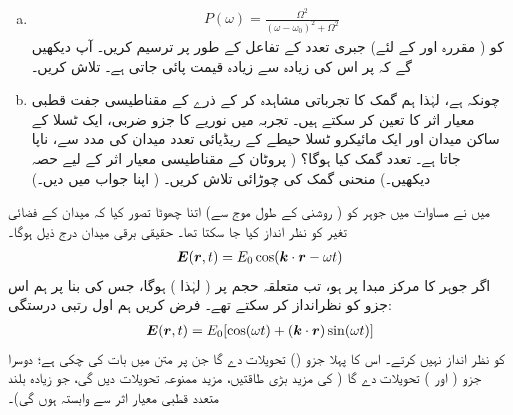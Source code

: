 \begin{enumerate}[a.]
 
\item
{}
\begin{align}
	P(\omega) = \frac{\Omega^2}{(\omega-\omega_0)^2+\Omega^2}
\end{align}
کو ( مقررہ  اور  کے لئے) جبری تعدد  کے تفاعل کے طور پر ترسیم کریں۔ آپ دیکھیں گے کہ  پر اس کی زیادہ سے زیادہ قیمت پائی جاتی ہے۔  تلاش کریں۔
\item
 چونکہ  ہے، لہٰذا ہم گمک کا تجرباتی مشاہدہ کر کے ذرے کے مقناطیسی جفت قطبی معیار اثر کا تعین کر سکتے ہیں۔  تجربہ میں نوریے کا  جزو ضربی، ایک ٹسلا کے ساکن میدان اور ایک مائیکرو ٹسلا  حیطے کے ریڈیائی تعدد میدان کی مدد سے، ناپا جاتا ہے۔ تعدد گمک کیا ہوگا؟ ( پروٹان کے مقناطیسی معیار اثر کے لیے حصہ  دیکھیں۔) منحنی گمک کی چوڑائی تلاش کریں۔ ( اپنا جواب  میں دیں۔)
 \end{enumerate}
میں نے مساوات  میں جوہر کو ( روشنی کے طول موج سے) اتنا چھوٹا تصور کیا کہ میدان کے فضائی تغیر کو نظر انداز کیا جا سکتا تھا۔ حقیقی برقی میدان درج ذیل ہوگا۔
\begin{align}
{\ensuremath{{\boldsymbol{E}}}}({{\boldsymbol{r}}},t) = E_0\cos({{\boldsymbol{k}}}\cdot {\ensuremath{{\boldsymbol{r}}}}-\omega t)
\end{align}
اگر جوہر کا مرکز مبدا پر ہو، تب متعلقہ حجم پر  
( لہٰذا  ) ہوگا، جس کی بنا پر ہم اس جزو کو نظرانداز کر سکتے تھے۔ فرض کریں ہم اول رتبی درستگی:
\begin{align}
{\ensuremath{{\boldsymbol{E}}}}({{\boldsymbol{r}}},t) = E_0[\cos(\omega t)+({{\boldsymbol{k}}}\cdot{\ensuremath{{\boldsymbol{r}}}})\sin(\omega t)]
\end{align}
کو نظر انداز نہیں کرتے۔ اس کا پہلا جزو  ()  تحویلات دے گا جن پر متن میں بات کی چکی ہے؛ دوسرا جزو  (  اور ) تحویلات دے گا (  کی مزید بڑی طاقتیں، مزید ممنوعہ تحویلات دیں گی، جو زیادہ بلند متعدد قطبی معیار اثر سے وابستہ ہوں گی)۔
